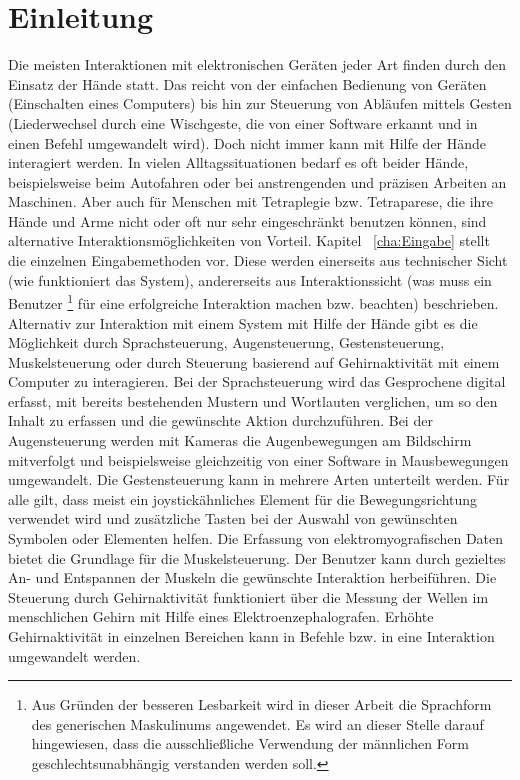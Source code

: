 \chapter{Einleitung}
\label{cha:Einleitung}

Die meisten Interaktionen mit elektronischen Geräten jeder Art finden durch den \mbox{Einsatz} der Hände statt. Das reicht von der einfachen Bedienung von Geräten (\zB Einschalten eines Computers) bis hin zur Steuerung von Abläufen mittels Gesten (\zB Liederwechsel durch eine Wischgeste, die von einer Software erkannt und in einen Befehl umgewandelt wird). Doch nicht immer kann mit Hilfe der Hände interagiert werden. 
In vielen Alltagssituationen bedarf es oft beider Hände, beispielsweise beim Autofahren oder bei anstrengenden und präzisen Arbeiten an Maschinen. Aber auch für Menschen mit \mbox{Tetraplegie} bzw. Tetraparese, die ihre Hände und Arme nicht oder oft nur sehr eingeschränkt benutzen können, sind alternative Interaktionsmöglichkeiten von Vorteil.
\newline \newline
Kapitel ~\ref{cha:Eingabe} stellt die einzelnen Eingabemethoden vor. Diese werden einerseits aus technischer Sicht (wie funktioniert das System), andererseits aus Interaktionssicht (was muss ein Benutzer%
\footnote{Aus Gründen der besseren Lesbarkeit wird in dieser Arbeit die Sprachform des generischen Maskulinums angewendet. Es wird an dieser Stelle darauf hingewiesen, dass die ausschließliche Verwendung der männlichen Form geschlechtsunabhängig verstanden werden soll.}
%
 für eine erfolgreiche Interaktion machen bzw. beachten) beschrieben. \mbox{Alternativ} zur Interaktion mit einem System mit Hilfe der Hände gibt es die Möglichkeit durch Sprachsteuerung, Augensteuerung, Gestensteuerung, Muskelsteuerung oder durch Steuerung basierend auf Gehirnaktivität mit einem Computer zu interagieren. Bei der Sprachsteuerung wird das Gesprochene digital erfasst, mit bereits bestehenden Mustern und Wortlauten verglichen, um so den Inhalt zu erfassen und die gewünschte Aktion durchzuführen. Bei der Augensteuerung werden mit Kameras die Augenbewegungen am Bildschirm mitverfolgt und beispielsweise gleichzeitig von einer Software in Mausbewegungen umgewandelt. Die Gestensteuerung kann in mehrere Arten unterteilt werden. Für alle gilt, dass meist ein joystickähnliches Element für die Bewegungsrichtung verwendet wird und zusätzliche Tasten bei der Auswahl von gewünschten Symbolen oder Elementen helfen. Die Erfassung von elektromyografischen Daten bietet die Grundlage für die Muskelsteuerung. Der Benutzer kann durch gezieltes An- und Entspannen der Muskeln die gewünschte Interaktion herbeiführen. Die Steuerung durch Gehirnaktivität funktioniert über die Messung der Wellen im menschlichen Gehirn mit Hilfe eines  Elektroenzephalografen. Erhöhte Gehirnaktivität in einzelnen Bereichen kann in \mbox{Befehle} bzw. in eine Interaktion umgewandelt werden.

